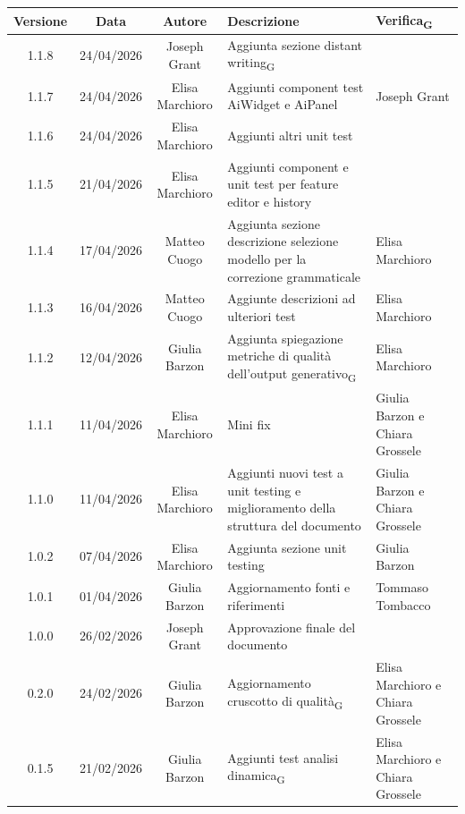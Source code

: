 \documentclass[11pt,a4paper]{article}
\newcommand{\gls}[1]{#1\textsubscript{G}}
\begin{document}
\begin{table}[H]
    \centering
    \begin{tabular}{|c|c|c|>{\raggedright\arraybackslash}p{}|p{}|}
        \hline
        \textbf{Versione} & \textbf{Data} & \textbf{Autore} & \textbf{Descrizione} & \textbf{\gls{Verifica}} \\
        \hline
        1.1.8 & 24/04/2026 & Joseph Grant & Aggiunta sezione \gls{distant writing} & \\
        \hline
        1.1.7 & 24/04/2026 & Elisa Marchioro & Aggiunti component test AiWidget e AiPanel & Joseph Grant \\
        \hline
        1.1.6 & 24/04/2026 & Elisa Marchioro & Aggiunti altri unit test & \\
        \hline
        1.1.5 & 21/04/2026 & Elisa Marchioro & Aggiunti component e unit test per feature editor e history & \\
        \hline
        1.1.4 & 17/04/2026 & Matteo Cuogo & Aggiunta sezione descrizione selezione modello per la correzione grammaticale & Elisa Marchioro\\
        \hline
        1.1.3 & 16/04/2026 & Matteo Cuogo & Aggiunte descrizioni ad ulteriori test & Elisa Marchioro\\
        \hline
        1.1.2 & 12/04/2026 & Giulia Barzon & Aggiunta spiegazione metriche di \gls{qualità dell'output generativo} & Elisa Marchioro\\
        \hline
        1.1.1 & 11/04/2026 & Elisa Marchioro & Mini fix & Giulia Barzon e Chiara Grossele\\
        \hline
        1.1.0 & 11/04/2026 & Elisa Marchioro & Aggiunti nuovi test a unit testing e miglioramento della struttura del documento & Giulia Barzon e Chiara Grossele\\
        \hline
        1.0.2 & 07/04/2026 & Elisa Marchioro & Aggiunta sezione unit testing & Giulia Barzon\\
        \hline
        1.0.1 & 01/04/2026 & Giulia Barzon & Aggiornamento fonti e riferimenti & Tommaso Tombacco \\
        \hline
        1.0.0 & 26/02/2026 & Joseph Grant & Approvazione finale del documento &  \\
        \hline
        0.2.0 & 24/02/2026 & Giulia Barzon & Aggiornamento \gls{cruscotto di qualità} & Elisa Marchioro e Chiara Grossele\\
        \hline
        0.1.5 & 21/02/2026 & Giulia Barzon & Aggiunti test \gls{analisi dinamica} & Elisa Marchioro e Chiara Grossele\\

\end{tabular}
\end{table}
\end{document}
